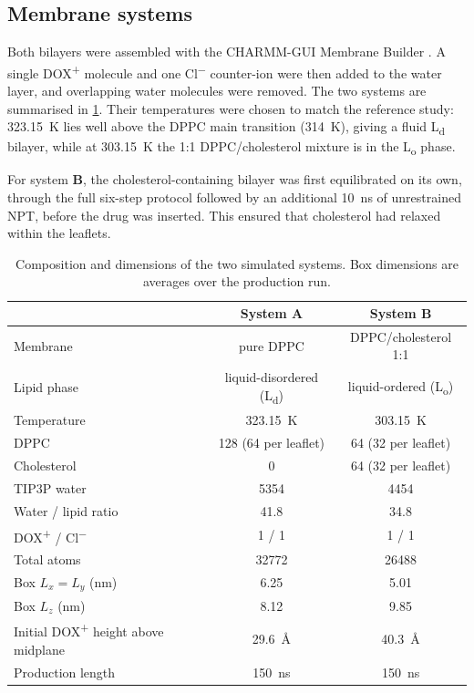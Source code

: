 \documentclass[11pt,a4paper]{article}
\newcommand{\dox}{DOX\textsuperscript{+}}
\newcommand{\sysA}{\textcolor{sysA}{\textbf{A}}}
\newcommand{\sysB}{\textcolor{sysB}{\textbf{B}}}
\newcommand{\Ld}{L\textsubscript{d}}
\newcommand{\Lo}{L\textsubscript{o}}
\begin{document}
\subsection{Membrane systems}
Both bilayers were assembled with the CHARMM-GUI Membrane Builder \cite{jo2008,wu2014,lee2016}. A
single \dox{} molecule and one Cl\textsuperscript{$-$} counter-ion were then added to the water
layer, and overlapping water molecules were removed. The two systems are summarised in
\cref{tab:systems}. Their temperatures were chosen to match the reference study: \SI{323.15}{K} lies
well above the DPPC main transition (\SI{314}{K}), giving a fluid \Ld{} bilayer, while at
\SI{303.15}{K} the 1:1 DPPC/cholesterol mixture is in the \Lo{} phase.

For system \sysB{}, the cholesterol-containing bilayer was first equilibrated on its own, through the
full six-step protocol followed by an additional \SI{10}{ns} of unrestrained NPT, before the drug
was inserted. This ensured that cholesterol had relaxed within the leaflets.

\begin{table}[!htbp]
\centering
\caption[Composition of the simulated systems]{Composition and dimensions of the two simulated systems.
Box dimensions are averages over the production run.}
\label{tab:systems}
\begin{tabular}{@{}lcc@{}}
\toprule
 & \textbf{System \sysA} & \textbf{System \sysB} \\
\midrule
Membrane            & pure DPPC            & DPPC/cholesterol 1:1 \\
Lipid phase         & liquid-disordered (\Ld) & liquid-ordered (\Lo) \\
Temperature         & \SI{323.15}{K}       & \SI{303.15}{K} \\
DPPC                & 128 (64 per leaflet) & 64 (32 per leaflet) \\
Cholesterol         & 0                    & 64 (32 per leaflet) \\
TIP3P water         & 5354                 & 4454 \\
Water / lipid ratio & 41.8                 & 34.8 \\
\dox{} / Cl\textsuperscript{$-$} & 1 / 1   & 1 / 1 \\
Total atoms         & \num{32772}          & \num{26488} \\
Box $L_x = L_y$ (nm) & 6.25                & 5.01 \\
Box $L_z$ (nm)      & 8.12                 & 9.85 \\
Initial \dox{} height above midplane & \SI{29.6}{\angstrom} & \SI{40.3}{\angstrom} \\
Production length   & \SI{150}{ns}         & \SI{150}{ns} \\
\bottomrule
\end{tabular}
\end{table}
\end{document}
